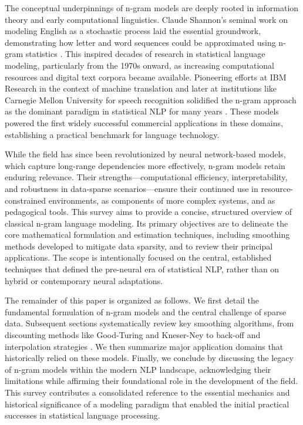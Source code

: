 \documentclass[10pt,a4paper]{article}
\begin{document}
The conceptual underpinnings of n-gram models are deeply rooted in information theory and early computational linguistics. Claude Shannon's seminal work on modeling English as a stochastic process laid the essential groundwork, demonstrating how letter and word sequences could be approximated using n-gram statistics \cite{anonndshannon1951}. This inspired decades of research in statistical language modeling, particularly from the 1970s onward, as increasing computational resources and digital text corpora became available. Pioneering efforts at IBM Research in the context of machine translation and later at institutions like Carnegie Mellon University for speech recognition solidified the n-gram approach as the dominant paradigm in statistical NLP for many years \cite{anonndbrown1993}. These models powered the first widely successful commercial applications in these domains, establishing a practical benchmark for language technology.

While the field has since been revolutionized by neural network-based models, which capture long-range dependencies more effectively, n-gram models retain enduring relevance. Their strengths—computational efficiency, interpretability, and robustness in data-sparse scenarios—ensure their continued use in resource-constrained environments, as components of more complex systems, and as pedagogical tools. This survey aims to provide a concise, structured overview of classical n-gram language modeling. Its primary objectives are to delineate the core mathematical formulation and estimation techniques, including smoothing methods developed to mitigate data sparsity, and to review their principal applications. The scope is intentionally focused on the central, established techniques that defined the pre-neural era of statistical NLP, rather than on hybrid or contemporary neural adaptations.

The remainder of this paper is organized as follows. We first detail the fundamental formulation of n-gram models and the central challenge of sparse data. Subsequent sections systematically review key smoothing algorithms, from discounting methods like Good-Turing and Kneser-Ney to back-off and interpolation strategies \cite{anonndchen1999}. We then summarize major application domains that historically relied on these models. Finally, we conclude by discussing the legacy of n-gram models within the modern NLP landscape, acknowledging their limitations while affirming their foundational role in the development of the field. This survey contributes a consolidated reference to the essential mechanics and historical significance of a modeling paradigm that enabled the initial practical successes in statistical language processing.
\end{document}
